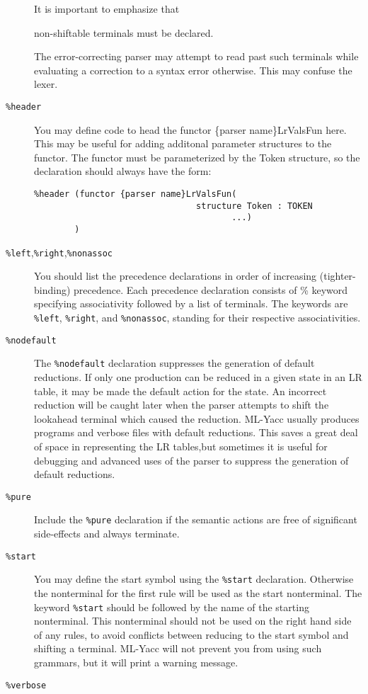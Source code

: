 \begin{description}
It is important to emphasize that
\begin{em}
non-shiftable terminals must be declared.
\end{em}
The error-correcting parser may attempt to read past such terminals
while evaluating a correction to a syntax error otherwise.  This may
confuse the lexer.
\item[{\tt \%header}]
\begin{samepage}
You may define code to head the functor \{parser name\}LrValsFun here.  This
may be useful for adding additonal parameter structures to the functor.
The functor must be parameterized by the Token structure, so
the declaration should always have the form:
\begin{tt}
\begin{verbatim}
%header (functor {parser name}LrValsFun(
                                structure Token : TOKEN
                                       ...) 
        )
\end{verbatim}
\end{tt}
\end{samepage}
\item[{\tt \%left},{\tt \%right},{\tt \%nonassoc}]
You should list the precedence declarations in order of increasing (tighter-binding)
 precedence.  Each precedence declaration consists
of \% keyword specifying associativity followed by a list of terminals.
The keywords are {\tt \%left}, {\tt \%right}, and {\tt \%nonassoc},
standing for their respective associativities.
\item[{\tt \%nodefault}]
The {\tt \%nodefault} declaration suppresses the generation of default
reductions.  If only one production can be reduced in a given state in
an LR table, it may be made the default action for the state.  An incorrect
reduction will be caught later when the parser attempts to shift the lookahead
terminal which caused the reduction. ML-Yacc usually produces programs and
verbose files with default reductions.  This saves a great deal of
space in representing the LR tables,but
sometimes it is useful for debugging and advanced
uses of the parser to suppress the generation of default reductions.
\item[{\tt \%pure}]
Include the {\tt \%pure} declaration if the semantic actions
are free of significant side-effects and always terminate.
\item[{\tt \%start}]
You may define the start symbol using
the {\tt \%start} declaration.  Otherwise the nonterminal for the
first rule will be used as the start nonterminal.
The keyword {\tt \%start} should be followed by the name of the starting
nonterminal.  This nonterminal should not be used on the right hand
side of any rules, to avoid conflicts between reducing to the start
symbol and shifting a terminal.  ML-Yacc will not prevent you
from using such grammars, but it will print a warning message.
\item[{\tt \%verbose}]


\end{description}
